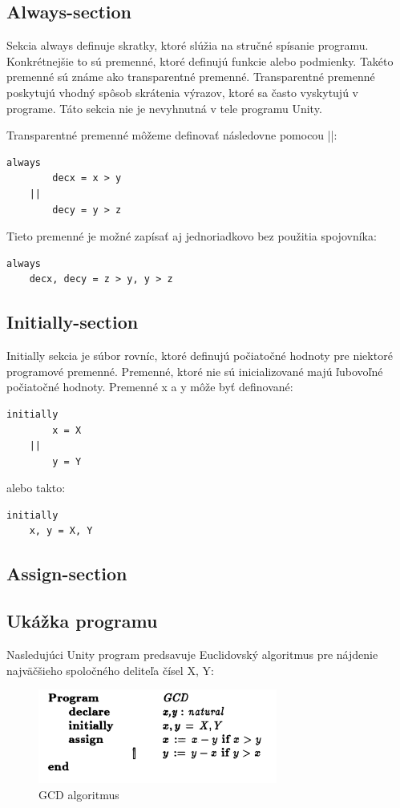 \subsection{Always-section}

Sekcia always definuje skratky, ktoré slúžia na stručné spísanie programu. Konkrétnejšie to sú premenné, ktoré definujú funkcie alebo podmienky. Takéto premenné sú známe ako transparentné premenné. Transparentné premenné poskytujú vhodný spôsob skrátenia výrazov, ktoré sa často vyskytujú v programe. Táto sekcia nie je nevyhnutná v tele programu Unity. 

Transparentné premenné môžeme definovať následovne pomocou ||:
\begin{lstlisting}
always
		decx = x > y
	||
		decy = y > z
\end{lstlisting}
Tieto premenné je možné zapísať aj jednoriadkovo bez použitia spojovníka:

\begin{lstlisting}
always
	decx, decy = z > y, y > z
\end{lstlisting}

\subsection{Initially-section}

Initially sekcia je súbor rovníc, ktoré definujú počiatočné hodnoty pre niektoré programové premenné. Premenné, ktoré nie sú inicializované majú ľubovoľné počiatočné hodnoty. Premenné x a y môže byť definované:

\begin{lstlisting}
initially
		x = X
	||
		y = Y
\end{lstlisting}

alebo takto:

\begin{lstlisting}
initially
	x, y = X, Y
\end{lstlisting}
\subsection{Assign-section}


\subsection{Ukážka programu}
Nasledujúci Unity program predsavuje Euclidovský algoritmus pre nájdenie najväčšieho spoločného deliteľa čísel X, Y:
\begin{figure}[h]
\centerline{\includegraphics[width=0.7\textwidth]{images/screen2}}
\caption[GCD algoritmus]{GCD algoritmus}
\label{obr:gcd}
\end{figure}

